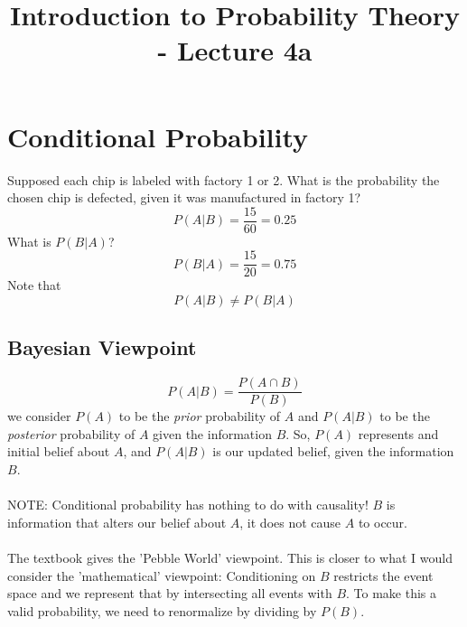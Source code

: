 \documentclass[12pt]{article} %
\title{Introduction to Probability Theory - Lecture 4a}
\begin{document}
\maketitle
\section{Conditional Probability}
Supposed each chip is labeled with factory 1 or 2. What is the probability the chosen chip is defected, given it was manufactured in factory 1?
$$P(A|B) = \frac{15}{60} = 0.25$$
What is $P(B|A)$?
$$P(B|A) = \frac{15}{20} = 0.75$$
Note that
$$P(A|B) \neq P(B|A)$$
\subsection{Bayesian Viewpoint}
$$P(A|B) = \frac{P(A\cap B)}{P(B)}$$
we consider $P(A)$ to be the \emph{prior} probability of $A$ and $P(A|B)$ to be the \emph{posterior} probability of $A$ given the information $B$. So, $P(A)$ represents and initial belief about $A$, and $P(A|B)$ is our updated belief, given the information $B$.\\\\
NOTE: Conditional probability has nothing to do with causality! $B$ is information that alters our belief about $A$, it does not cause $A$ to occur.\\\\
The textbook gives the 'Pebble World' viewpoint. This is closer to what I would consider the 'mathematical' viewpoint: Conditioning on $B$ restricts the event space and we represent that by intersecting all events with $B$. To make this a valid probability, we need to renormalize by dividing by $P(B)$.
\end{document}
